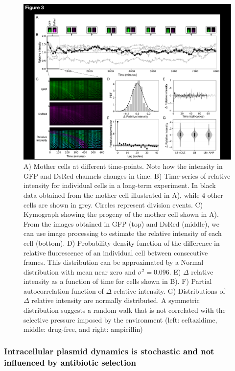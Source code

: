 \documentclass[fleqn,12pt]{wlscirep}
\newcommand{\blue}[1]{\textcolor{black}{#1}}
\begin{document}
\begin{figure}[ht!]
\centering
\includegraphics[width=.9\linewidth]{figures/Figure3.pdf}
\caption{ \small{ A) Mother cells at different time-points.  Note how the intensity in GFP and DsRed channels changes in time.  B) Time-series of relative intensity for individual cells in a long-term experiment. In black data obtained from the mother cell illustrated in A), while 4 other cells are shown in grey. Circles represent division events. C) Kymograph showing the progeny of the mother cell shown in A). From the images obtained in GFP (top) and DsRed (middle), we can use image processing to estimate the relative intensity of each cell (bottom).  D) Probability density function of the difference in relative fluorescence of an individual cell between consecutive frames.  This distribution can be approximated by a Normal distribution with mean near zero and $\sigma^2=0.096$.  E) $\Delta$ relative intensity as a function of time for cells shown in B).  F) Partial autocorrelation function of $\Delta$ relative intensity.  G) Distributions of $\Delta$ relative intensity are normally distributed.  A symmetric distribution suggests a random walk that is not correlated with the selective pressure imposed by the environment (left: ceftazidime, middle: drug-free, and right: ampicillin) }}
\label{fig:mother-machine}
\end{figure}

\subsubsection{Intracellular plasmid dynamics is stochastic \blue{and not influenced by antibiotic selection}}
\end{document}

